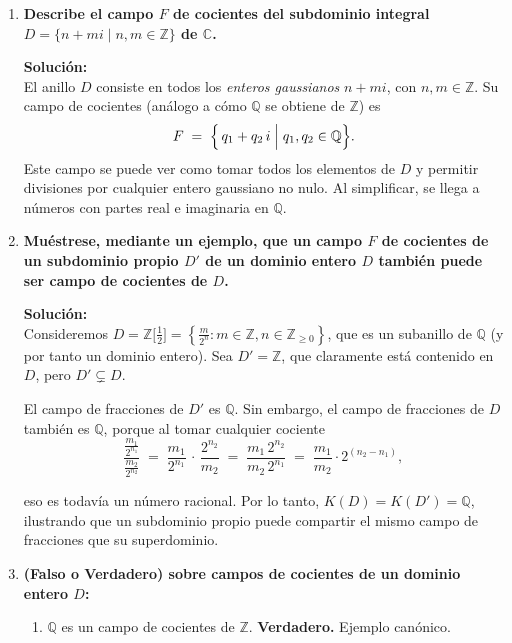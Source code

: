 \documentclass[12pt]{article}
\theoremstyle{definition}
\theoremstyle{remark}
\begin{document}
\begin{enumerate}[label=\textbf{\arabic*.}]
\item \textbf{Describe el campo $F$ de cocientes del subdominio integral $D = \{n + mi \mid n, m \in \mathbb{Z}\}$ de $\mathbb{C}$.}

\textbf{Solución:}\\
El anillo $D$ consiste en todos los \emph{enteros gaussianos} $n + mi$, con $n,m \in \mathbb{Z}$. Su campo de cocientes (análogo a cómo $\mathbb{Q}$ se obtiene de $\mathbb{Z}$) es
\[
F \;=\; \Bigl\{\,q_1 + q_2\,i \;\Big|\; q_1,q_2 \in \mathbb{Q}\Bigr\}.
\]
Este campo se puede ver como tomar todos los elementos de $D$ y permitir divisiones por cualquier entero gaussiano no nulo. Al simplificar, se llega a números con partes real e imaginaria en $\mathbb{Q}$.


\item \textbf{Muéstrese, mediante un ejemplo, que un campo $F$ de cocientes de un subdominio propio $D'$ de un dominio entero $D$ también puede ser campo de cocientes de $D$.}

\textbf{Solución:}\\
Consideremos $D = \mathbb{Z}\bigl[\tfrac{1}{2}\bigr] = \left\{\frac{m}{2^n} : m \in \mathbb{Z}, n \in \mathbb{Z}_{\ge 0}\right\}$, que es un subanillo de $\mathbb{Q}$ (y por tanto un dominio entero). 
Sea $D' = \mathbb{Z}$, que claramente está contenido en $D$, pero $D' \subsetneq D$.

\smallskip

El campo de fracciones de $D'$ es $\mathbb{Q}$. Sin embargo, el campo de fracciones de $D$ también es $\mathbb{Q}$, porque al tomar cualquier cociente 
\[
  \frac{\frac{m_1}{2^{n_1}}}{\frac{m_2}{2^{n_2}}}
  \;=\;
  \frac{m_1}{2^{n_1}} \,\cdot\, \frac{2^{n_2}}{m_2}
  \;=\;
  \frac{m_1\,2^{n_2}}{m_2\,2^{n_1}}
  \;=\;
  \frac{m_1}{m_2}\cdot 2^{(n_2 - n_1)},
\]

eso es todavía un número racional. Por lo tanto, $K(D) = K(D') = \mathbb{Q}$, ilustrando que un subdominio propio puede compartir el mismo campo de fracciones que su superdominio.


\item \textbf{(Falso o Verdadero) sobre campos de cocientes de un dominio entero $D$:}

\begin{enumerate}[label=(\alph*)]
\item $\mathbb{Q}$ es un campo de cocientes de $\mathbb{Z}$.  
\textbf{Verdadero.} Ejemplo canónico.


\end{enumerate}
\end{enumerate}
\end{document}
